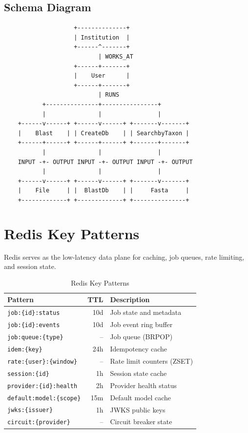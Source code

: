 \subsection{Schema Diagram}

\begin{verbatim}
                    +--------------+
                    | Institution  |
                    +------^-------+
                           | WORKS_AT
                    +------+-------+
                    |    User      |
                    +------+-------+
                           | RUNS
           +---------------+----------------+
           |               |                |
    +------v------+ +------v------+ +-------v-------+
    |    Blast    | | CreateDb    | | SearchbyTaxon |
    +------+------+ +------+------+ +-------+-------+
           |               |                |
    INPUT -+- OUTPUT INPUT -+- OUTPUT INPUT -+- OUTPUT
           |               |                |
    +------v------+ +------v------+ +-------v-------+
    |    File     | |  BlastDb    | |     Fasta     |
    +-------------+ +-------------+ +---------------+
\end{verbatim}

\section{Redis Key Patterns}
\label{app:db:redis}

Redis serves as the low-latency data plane for caching, job queues, rate limiting, and session state.

\begin{table}[ht]
\centering
\caption{Redis Key Patterns}
\label{tab:redis-keys}
\small
\begin{tabularx}{\textwidth}{lrX}
    \hline
    \textbf{Pattern} & \textbf{TTL} & \textbf{Description} \\
    \hline
    \texttt{job:\{id\}:status} & 10d & Job state and metadata \\
    \texttt{job:\{id\}:events} & 10d & Job event ring buffer \\
    \texttt{job:queue:\{type\}} & -- & Job queue (BRPOP) \\
    \texttt{idem:\{key\}} & 24h & Idempotency cache \\
    \texttt{rate:\{user\}:\{window\}} & -- & Rate limit counters (ZSET) \\
    \texttt{session:\{id\}} & 1h & Session state cache \\
    \texttt{provider:\{id\}:health} & 2h & Provider health status \\
    \texttt{default:model:\{scope\}} & 15m & Default model cache \\
    \texttt{jwks:\{issuer\}} & 1h & JWKS public keys \\
    \texttt{circuit:\{provider\}} & -- & Circuit breaker state \\
    \hline
\end{tabularx}
\end{table}

